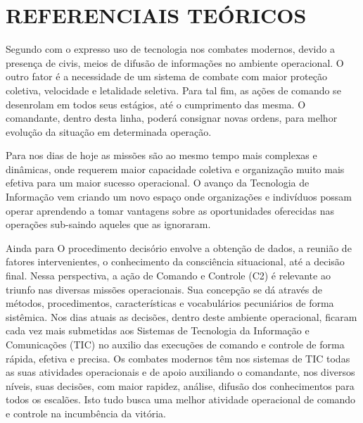 
\chapter{REFERENCIAIS TEÓRICOS}
\label{chap:refenciaisteoricos}

Segundo  com o expresso uso de tecnologia nos combates modernos, devido a presença de civis, meios de difusão de informações no ambiente operacional. O outro fator é a necessidade de um  sistema de combate com maior proteção coletiva, velocidade e letalidade seletiva. Para tal fim, as ações de comando se desenrolam em todos seus estágios, até o cumprimento das mesma. O comandante, dentro desta linha, poderá consignar novas ordens, para melhor evolução da situação em determinada operação.

Para  nos dias de hoje as missões são ao mesmo tempo mais complexas e dinâmicas, onde requerem maior capacidade coletiva e organização muito mais efetiva para um maior sucesso operacional. O avanço da  Tecnologia de Informação vem criando um novo espaço onde organizações e indivíduos possam operar aprendendo a tomar vantagens sobre as oportunidades oferecidas nas operações sub-saindo aqueles que as ignoraram.


Ainda para  O procedimento decisório envolve a obtenção de dados, a reunião de fatores intervenientes, o conhecimento da consciência situacional, até a decisão final. Nessa perspectiva, a ação de Comando e Controle (C2) é relevante ao triunfo nas diversas missões operacionais. Sua concepção se dá através de métodos, procedimentos, características  e vocabulários pecuniários de forma sistêmica. Nos dias atuais as decisões, dentro deste ambiente operacional, ficaram cada vez mais submetidas aos Sistemas de Tecnologia da Informação e Comunicações (TIC) no auxilio das execuções de comando e controle de forma rápida, efetiva e precisa. Os combates modernos têm nos sistemas de TIC todas as suas atividades operacionais e de apoio auxiliando o comandante, nos diversos níveis, suas decisões, com maior rapidez, análise, difusão dos conhecimentos para todos os escalões. Isto tudo busca uma melhor atividade operacional de comando e controle na incumbência da vitória. 



